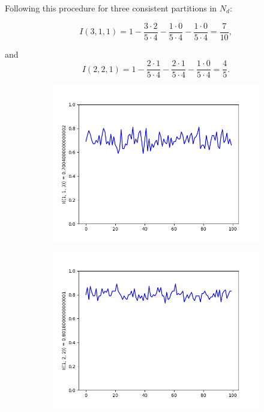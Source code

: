 \documentclass{llncs}
\begin{document}
Following this procedure for three consistent partitions in $N_d$:

\[I(3,1,1) = 1 - \frac{3 \cdot 2}{5 \cdot 4} - \frac{1 \cdot 0}{5 \cdot 4} - \frac{1 \cdot 0}{5 \cdot 4} = \frac{7}{10} ,\]

and 
\[I(2,2,1) = 1 - \frac{2 \cdot 1}{5 \cdot 4} - \frac{2 \cdot 1}{5  \cdot 4} - \frac{1 \cdot 0}{5 \cdot 4} = \frac{4}{5} .\]


\begin{figure}
\begin{subfigure}{0.5\linewidth}
\centering\includegraphics[scale=0.4]{images/1-1-3-consistent-partitions-probability.png}
\end{subfigure}
\begin{subfigure}{0.5\linewidth}
\centering\includegraphics[scale=0.4]{images/1-2-2-consistent-partitions-probability.png}
\end{subfigure}

\end{figure}
\end{document}
